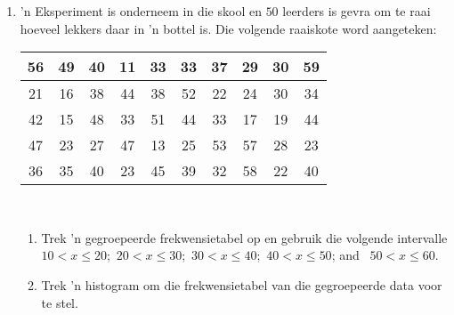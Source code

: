 \begin{exercises}{}{
    \begin{enumerate}[itemsep=5pt, label=\textbf{\arabic*}. ]
    \item ’n Eksperiment is onderneem in die skool en $50$ leerders is gevra om te raai hoeveel lekkers daar in ’n bottel is. Die volgende raaiskote word aangeteken:
      \\
      \begin{center}
        \begin{tabular}{|c|c|c|c|c|c|c|c|c|c|} \hline
          56 & 49 & 40 & 11 & 33 & 33 & 37 & 29 & 30 & 59 \\ \hline
          21 & 16 & 38 & 44 & 38 & 52 & 22 & 24 & 30 & 34 \\\hline
          42 & 15 & 48 & 33 & 51 & 44 & 33 & 17 & 19 & 44 \\\hline
          47 & 23 & 27 & 47 & 13 & 25 & 53 & 57 & 28 & 23 \\\hline
          36 & 35 & 40 & 23 & 45 & 39 & 32 & 58 & 22 & 40 \\\hline
        \end{tabular}
      \end{center}
      \vspace{8pt}\\

      \begin{enumerate}[noitemsep, label=\textbf{(\alph*)} ]
      \item Trek ’n gegroepeerde frekwensietabel op en gebruik die volgende intervalle
        $10 < x \leq 20$;\ $20 < x \leq 30$;\ $30 < x \leq 40$;\ 
        $40 < x \leq 50$; and \ $50 < x \leq 60$.
      \item Trek ’n histogram om die frekwensietabel van die gegroepeerde data voor te stel.
      \end{enumerate}
    \end{enumerate}
}
\end{exercises}


